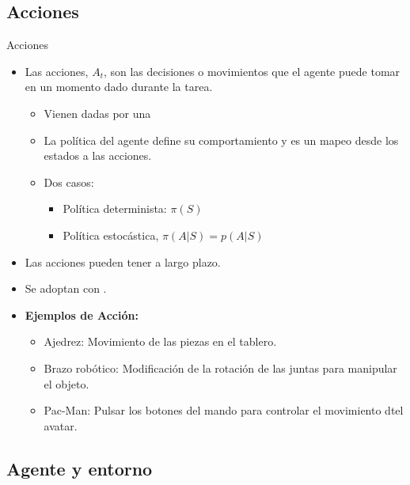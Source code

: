 \documentclass[10pt, envcountsect, handout, aspectratio=1610, hyperref={hypertexnames=true}]{beamer}
\begin{document}
\subsection{Acciones}


\begin{frame}{Acciones}
\begin{itemize}
  \item {} Las acciones, $A_t$, son las decisiones o movimientos que el agente puede tomar en un momento dado durante la tarea.
  	\begin{itemize}
	\item Vienen dadas por una  
	\item La política del agente define su comportamiento y es un mapeo desde los estados a las acciones. 
	\item Dos casos: 
		\begin{itemize}
		\item Política determinista: $\pi(S)$
		\item Política estocástica, $\pi(A|S)=p(A|S)$
		\end{itemize}
	\end{itemize}

  \item Las acciones pueden tener  a largo plazo.

  \item Se adoptan con .
  	
  \item \textbf{Ejemplos de Acción:}
    \begin{itemize}
      \item Ajedrez: Movimiento de las piezas en el tablero.
      \item Brazo robótico: Modificación de la rotación de las juntas para manipular el objeto.
      \item Pac-Man: Pulsar los botones del mando para controlar el movimiento dtel avatar.
    \end{itemize}
\end{itemize}


\end{frame}




\subsection{Agente y  entorno}
\end{document}
